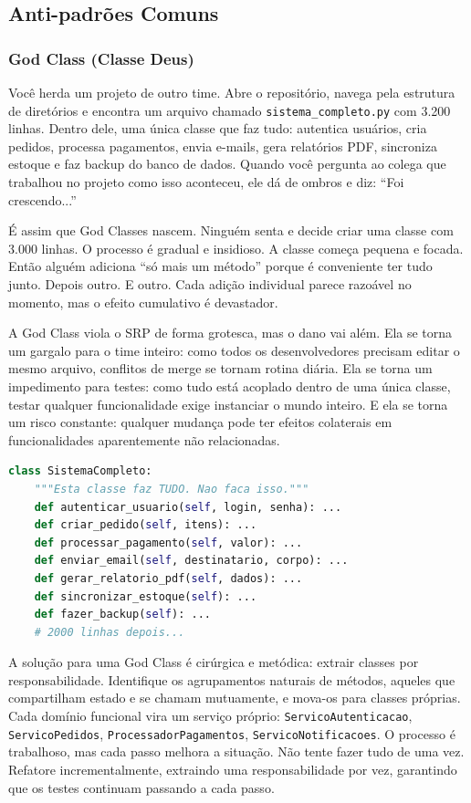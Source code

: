 \subsection{Anti-padrões Comuns}

\subsubsection{God Class (Classe Deus)}

Você herda um projeto de outro time. Abre o repositório, navega pela estrutura
de diretórios e encontra um arquivo chamado \texttt{sistema\_completo.py} com
3.200 linhas. Dentro dele, uma única classe que faz tudo: autentica usuários,
cria pedidos, processa pagamentos, envia e-mails, gera relatórios PDF,
sincroniza estoque e faz backup do banco de dados. Quando você pergunta ao
colega que trabalhou no projeto como isso aconteceu, ele dá de ombros e diz:
``Foi crescendo...''

É assim que God Classes nascem. Ninguém senta e decide criar uma
classe com 3.000 linhas. O processo é gradual e insidioso. A classe começa
pequena e focada. Então alguém adiciona ``só mais um método'' porque é
conveniente ter tudo junto. Depois outro. E outro. Cada adição individual
parece razoável no momento, mas o efeito cumulativo é devastador.

A God Class viola o SRP de forma grotesca, mas o dano vai além. Ela se torna
um gargalo para o time inteiro: como todos os desenvolvedores precisam editar
o mesmo arquivo, conflitos de merge se tornam rotina diária. Ela se torna um
impedimento para testes: como tudo está acoplado dentro de uma única classe,
testar qualquer funcionalidade exige instanciar o mundo inteiro. E ela se
torna um risco constante: qualquer mudança pode ter efeitos colaterais em
funcionalidades aparentemente não relacionadas.

\begin{lstlisting}[language=Python, caption={Anti-padrão: God Class}]
class SistemaCompleto:
    """Esta classe faz TUDO. Nao faca isso."""
    def autenticar_usuario(self, login, senha): ...
    def criar_pedido(self, itens): ...
    def processar_pagamento(self, valor): ...
    def enviar_email(self, destinatario, corpo): ...
    def gerar_relatorio_pdf(self, dados): ...
    def sincronizar_estoque(self): ...
    def fazer_backup(self): ...
    # 2000 linhas depois...
\end{lstlisting}

A solução para uma God Class é cirúrgica e metódica: extrair classes por
responsabilidade. Identifique os agrupamentos naturais de métodos,
aqueles que compartilham estado e se chamam mutuamente, e mova-os para
classes próprias. Cada domínio funcional vira um serviço próprio:
\texttt{ServicoAutenticacao}, \texttt{ServicoPedidos},
\texttt{ProcessadorPagamentos}, \texttt{ServicoNotificacoes}. O processo é
trabalhoso, mas cada passo melhora a situação. Não tente fazer tudo de uma
vez. Refatore incrementalmente, extraindo uma responsabilidade por vez,
garantindo que os testes continuam passando a cada passo.

